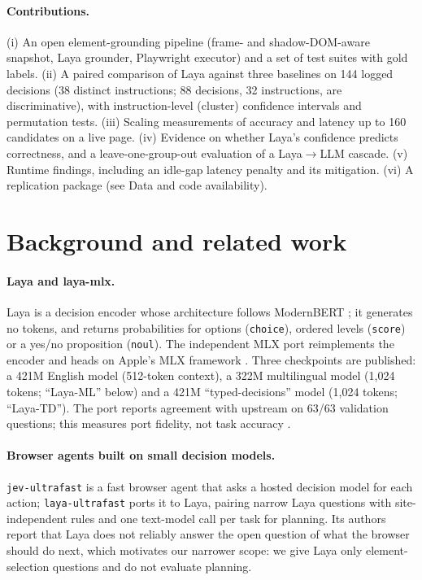 \documentclass[11pt,a4paper]{article}
\begin{document}
\paragraph{Contributions.} (i) An open element-grounding pipeline (frame- and shadow-DOM-aware snapshot, Laya grounder, Playwright executor) and a set of test suites with gold labels. (ii) A paired comparison of Laya against three baselines on 144 logged decisions (38 distinct instructions; 88 decisions, 32 instructions, are discriminative), with instruction-level (cluster) confidence intervals and permutation tests. (iii) Scaling measurements of accuracy and latency up to 160 candidates on a live page. (iv) Evidence on whether Laya's confidence predicts correctness, and a leave-one-group-out evaluation of a Laya$\to$LLM cascade. (v) Runtime findings, including an idle-gap latency penalty and its mitigation. (vi) A replication package (see Data and code availability).

\section{Background and related work}
\paragraph{Laya and laya-mlx.} Laya \cite{laya} is a decision encoder whose architecture follows ModernBERT \cite{modernbert}; it generates no tokens, and returns probabilities for options (\texttt{choice}), ordered levels (\texttt{score}) or a yes/no proposition (\texttt{noul}). The independent MLX port \cite{lmlx} reimplements the encoder and heads on Apple's MLX framework \cite{mlx}. Three checkpoints are published: a 421M English model (512-token context), a 322M multilingual model (1{,}024 tokens; ``Laya-ML'' below) and a 421M ``typed-decisions'' model (1{,}024 tokens; ``Laya-TD''). The port reports agreement with upstream on 63/63 validation questions; this measures port fidelity, not task accuracy \cite{lmlx}.

\paragraph{Browser agents built on small decision models.} \texttt{jev-ultrafast} \cite{jev} is a fast browser agent that asks a hosted decision model for each action; \texttt{laya-ultrafast} \cite{layaultrafast} ports it to Laya, pairing narrow Laya questions with site-independent rules and one text-model call per task for planning. Its authors report that Laya does not reliably answer the open question of what the browser should do next, which motivates our narrower scope: we give Laya only element-selection questions and do not evaluate planning.
\end{document}
